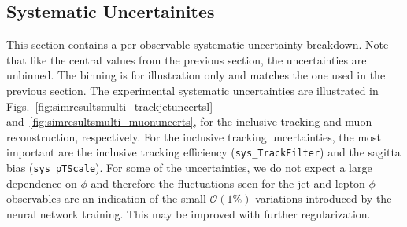 \subsection{Systematic Uncertainites}
\label{sec:multifolduncerts}

This section contains a per-observable systematic uncertainty breakdown.  Note that like the central values from the previous section, the uncertainties are unbinned.  The binning is for illustration only and matches the one used in the previous section.  The experimental systematic uncertainties are illustrated in Figs.~\ref{fig:simresultsmulti_trackjetuncertsl} and~\ref{fig:simresultsmulti_muonuncerts}, for the inclusive tracking and muon reconstruction, respectively.  For the inclusive tracking uncertainties, the most important are the inclusive tracking efficiency (\texttt{sys\_TrackFilter}) and the sagitta bias (\texttt{sys\_pTScale}).  For some of the uncertainties, we do not expect a large dependence on $\phi$ and therefore the fluctuations seen for the jet and lepton $\phi$ observables are an indication of the small $\mathcal{O}(1\%)$ variations introduced by the neural network training.  This may be improved with further regularization.

